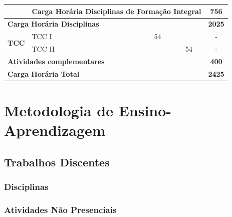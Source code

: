 \documentclass[11pt,fleqn]{book} %
\begin{document}
\begin{table}[]
{\begin{tabular}{|l|l|c|c|c|c|c|c|}
				& \multicolumn{6}{l|}{\textbf{Carga Horária Disciplinas de Formação Integral}}                                                                                     & \textbf{756}  \\ \hline
				\multicolumn{7}{|l|}{\textbf{Carga Horária Disciplinas}}                                                                                                           & \textbf{2025} \\ \hline
				\multirow{2}{*}{\textbf{TCC}}                 
				& TCC I                                         &                      &                      &                      & 54                   &                      & -             \\ \cline{2-8} 
				& TCC II                                        &                      &                      &                      &                      & 54                   & -             \\ \hline
				\multicolumn{7}{|l|}{\textbf{Atividades complementares}}                                                                                                                                                         & \textbf{400}  \\ \hline
				\multicolumn{7}{|l|}{\textbf{Carga Horária Total}}                                                                                                                                                               & \textbf{2425} \\ \hline
			\end{tabular}%
		}
	\end{table}




\section{Metodologia de Ensino-Aprendizagem}\label{metodologia}


\subsection{Trabalhos Discentes}\label{trabdiscentes}

\subsubsection{Disciplinas}\label{dsiciplinas}


\subsubsection{Atividades Não Presenciais}
\end{document}
